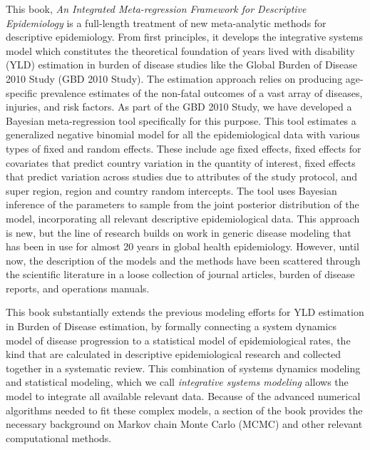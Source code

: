 This book, \emph{An Integrated Meta-regression Framework for Descriptive
  Epidemiology} is a full-length treatment of new meta-analytic
methods for descriptive epidemiology.  From first principles, it
develops the integrative systems model which constitutes the
theoretical foundation of years lived with disability (YLD) estimation
in burden of disease studies like the Global Burden of Disease 2010
Study (GBD 2010 Study).  The estimation approach relies on producing
age-specific prevalence estimates of the non-fatal outcomes of a vast
array of diseases, injuries, and risk factors.  As part of the GBD
2010 Study, we have developed a Bayesian meta-regression tool
specifically for this purpose. This tool estimates a generalized
negative binomial model for all the epidemiological data with various
types of fixed and random effects.  These include age fixed effects,
fixed effects for covariates that predict country variation in the
quantity of interest, fixed effects that predict variation across
studies due to attributes of the study protocol, and super region,
region and country random intercepts.  The tool uses Bayesian
inference of the parameters to sample from the joint posterior
distribution of the model, incorporating all relevant descriptive
epidemiological data.  This approach is new, but the line of research
builds on work in generic disease modeling that has been in use for
almost 20 years in global health
epidemiology.\cite{Barendregt_Generic_2003} However, until now, the
description of the models and the methods have been scattered through
the scientific literature in a loose collection of journal articles,
burden of disease reports, and operations manuals.

This book substantially extends the previous modeling efforts for YLD
estimation in Burden of Disease estimation, by formally connecting a
system dynamics model of disease progression to a statistical model of
epidemiological rates, the kind that are calculated in descriptive
epidemiological research and collected together in a systematic
review.  This combination of systems dynamics modeling and statistical
modeling, which we call
\emph{integrative systems modeling} allows the model to integrate all
available relevant data.  Because of the advanced numerical algorithms needed to fit these complex models, a section of the book provides the
necessary background on Markov chain Monte Carlo (MCMC) and other
relevant computational methods.

